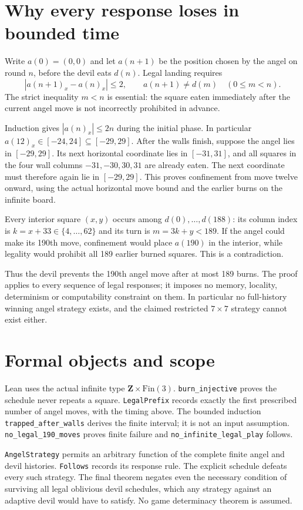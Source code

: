 \documentclass[11pt]{article}
\begin{document}
\newpage
\section{Why every response loses in bounded time}
Write $a(0)=(0,0)$ and let $a(n+1)$ be the position chosen by the angel
on round $n$, before the devil eats $d(n)$. Legal landing requires
\[
 |a(n+1)_x-a(n)_x|\le2,\qquad
 a(n+1)\ne d(m)\quad(0\le m<n).
\]
The strict inequality $m<n$ is essential: the square eaten immediately
after the current angel move is not incorrectly prohibited in advance.

Induction gives $|a(n)_x|\le2n$ during the initial phase.
In particular $a(12)_x\in[-24,24]\subseteq[-29,29]$.
After the walls finish, suppose the angel lies in $[-29,29]$.
Its next horizontal coordinate lies in $[-31,31]$, and all squares
in the four wall columns $-31,-30,30,31$ are already eaten.
The next coordinate must therefore again lie in $[-29,29]$.
This proves confinement from move twelve onward, using the actual
horizontal move bound and the earlier burns on the infinite board.

Every interior square $(x,y)$ occurs among $d(0),\ldots,d(188)$:
its column index is $k=x+33\in\{4,\ldots,62\}$ and its turn is
$m=3k+y<189$. If the angel could make its 190th move, confinement
would place $a(190)$ in the interior, while legality would prohibit
all 189 earlier burned squares. This is a contradiction.

Thus the devil prevents the 190th angel move after at most 189 burns.
The proof applies to every sequence of legal responses; it imposes
no memory, locality, determinism or computability constraint on them.
In particular no full-history winning angel strategy exists, and the
claimed restricted $7\times7$ strategy cannot exist either.

\section{Formal objects and scope}
Lean uses the actual infinite type $\mathbf Z\times\mathrm{Fin}(3)$.
\texttt{burn\_injective} proves the schedule never repeats a square.
\texttt{LegalPrefix} records exactly the first prescribed number of
angel moves, with the timing above. The bounded induction
\texttt{trapped\_after\_walls} derives the finite interval; it is not
an input assumption. \texttt{no\_legal\_190\_moves} proves finite
failure and \texttt{no\_infinite\_legal\_play} follows.

\texttt{AngelStrategy} permits an arbitrary function of the complete
finite angel and devil histories. \texttt{Follows} records its response
rule. The explicit schedule defeats every such strategy. The final
theorem negates even the necessary condition of surviving all legal
oblivious devil schedules, which any strategy against an adaptive
devil would have to satisfy. No game determinacy theorem is assumed.
\end{document}
